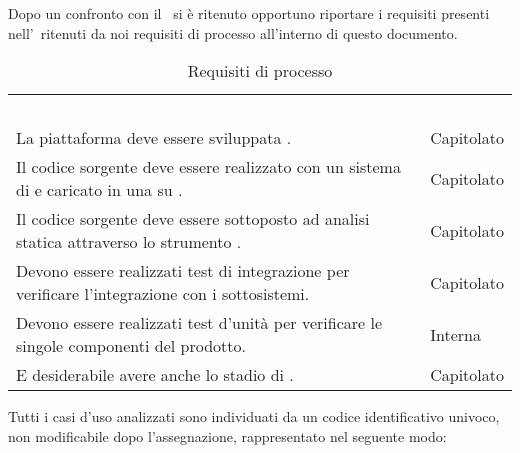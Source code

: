 \label{RequisitiProcesso}Dopo un confronto con il \VT\ si è ritenuto opportuno riportare i requisiti presenti nell'\AdR\ ritenuti da noi requisiti di processo all'interno di questo documento. 
\begin{table}[h]
	\centering
	\caption{Requisiti di processo} 
\renewcommand{\arraystretch}{1.5}
\begin{tabular}{|C{9.5cm} C{2.5cm}|} 
	
	\textcolor{white}{\textbf{Descrizione}}&
	\textcolor{white}{\textbf{Fonte}}\\	

	La piattaforma deve essere sviluppata . & Capitolato \\
	Il codice sorgente deve essere realizzato con un sistema di  e caricato in una  su . & Capitolato\\
	Il codice sorgente deve essere sottoposto ad analisi statica attraverso lo strumento . & Capitolato \\
	Devono essere realizzati test di integrazione per verificare l’integrazione con i sottosistemi. & Capitolato \\
	Devono essere realizzati test d’unità per verificare le singole componenti del prodotto. & Interna \\
	E desiderabile avere anche lo stadio di . & Capitolato \\
	\hline
\end{tabular}
\end{table}

Tutti i casi d'uso analizzati sono individuati da un codice identificativo univoco, non modificabile dopo l'assegnazione, rappresentato nel seguente modo:

